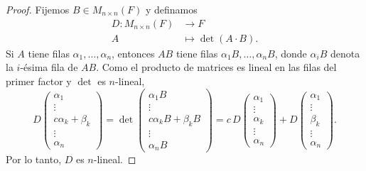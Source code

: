 \documentclass[12pt,a4paper]{book}
\begin{document}
    \begin{proof}
        Fijemos $B \in M_{n \times n}(F)$ y definamos
        \begin{align*}
            D: M_{n \times n}(F) & \longrightarrow F \\
            A & \longmapsto \det(A \cdot B).
        \end{align*}
        Si $A$ tiene filas $\alpha_{1}, \dots, \alpha_{n}$, entonces $AB$ tiene filas $\alpha_{1} B, \dots, \alpha_{n} B$, donde $\alpha_{i} B$ denota la $i$-ésima fila de $AB$. Como el producto de matrices es lineal en las filas del primer factor y $\det$ es $n$-lineal,
        \begin{equation*}
            D
            \begin{pmatrix}
                \alpha_{1} \\
                \vdots \\
                c\alpha_{k} + \beta_{k} \\
                \vdots \\
                \alpha_{n}
            \end{pmatrix}
            = \det
            \begin{pmatrix}
                \alpha_{1} B \\
                \vdots \\
                c\alpha_{k} B + \beta_{k} B \\
                \vdots \\
                \alpha_{n} B
            \end{pmatrix}
            = c \, D
            \begin{pmatrix}
                \alpha_{1} \\
                \vdots \\
                \alpha_{k} \\
                \vdots \\
                \alpha_{n}
            \end{pmatrix}
            + D
            \begin{pmatrix}
                \alpha_{1} \\
                \vdots \\
                \beta_{k} \\
                \vdots \\
                \alpha_{n}
            \end{pmatrix}.
        \end{equation*}
        Por lo tanto, $D$ es $n$-lineal.


\end{proof}
\end{document}
